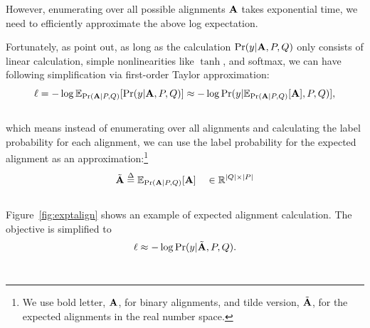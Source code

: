 
However, enumerating over all possible alignments $\mathbf{A}$ takes exponential
time, we need to efficiently approximate the above log expectation.

Fortunately, as  point out, as long as the calculation
$\mathrm{Pr}(y|\mathbf{A}, P, Q)$ only consists of linear calculation,
simple nonlinearities like $\tanh$, and softmax, we can 
have following simplification via first-order Taylor
approximation:
\[
\ell =  -\log \mathbb{E}_{\mathrm{Pr}(\mathbf{A}|P, Q)} [\mathrm{Pr}(y|\mathbf{A}, P, Q)]
\approx  -\log \mathrm{Pr}(y|\mathbb{E}_{\mathrm{Pr}(\mathbf{A}|P, Q)}[\mathbf{A}], P, Q)],
\]\\[-0.7cm]
which means instead of enumerating over all alignments 
and calculating the label probability for each alignment,
we can use the label probability for the expected alignment 
as an approximation:\footnote{
We use bold letter, $\mathbf{A}$,
for binary alignments, and tilde version, $\tilde{\mathbf{A}}$, for the 
expected alignments in the real number space.
}
\begin{equation}
\tilde{\mathbf{A}} \stackrel{\Delta}{=} \mathbb{E}_{\mathrm{Pr}(\mathbf{A}|P, Q)}[\mathbf{A}] \quad \in \mathbb{R}^{\lvert Q\rvert\times \lvert P\rvert}
\label{eq:expatt}
\end{equation}\\[-0.7cm]
Figure~\ref{fig:exptalign} shows an example of expected
alignment calculation.
The objective is simplified to
\begin{equation}
\ell \approx -\log \mathrm{Pr}(y|\tilde{\mathbf{A}}, P, Q).
\label{eq:newobj}
\end{equation}\\[-1.1cm]


